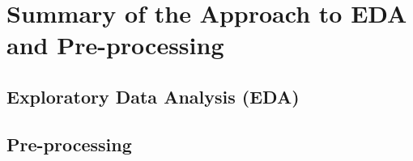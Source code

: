 \chapter{Summary of the Approach to EDA and Pre-processing}
\label{cha:chapter 2}

\section{Exploratory Data Analysis (EDA)}
\label{sec:chap2 section 1}

\section{Pre-processing}
\label{sec:chap2 section 2}

